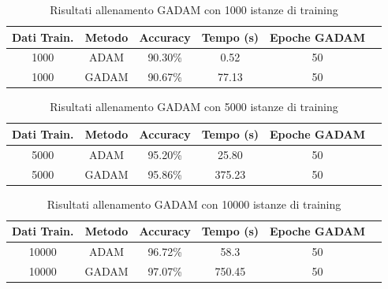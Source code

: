 \begin{table}[H]
\centering
\begin{tabular}{|c|c|c|c|c|c|}
\hline
\textbf{Dati Train.} & \textbf{Metodo} & \textbf{Accuracy}& \textbf{Tempo (s)} & \textbf{Epoche GADAM}\\
\hline
1000 & ADAM & 90.30\%  & 0.52 & 50 \\
\hline
1000 & GADAM &  90.67\%  & 77.13 & 50\\
\hline
\end{tabular}
\label{tab:GADAM_results_1000}
\caption{Risultati allenamento GADAM con 1000 istanze di training}
\end{table}


\begin{table}[htbp]
\centering
\begin{tabular}{|c|c|c|c|c|c|}
\hline
\textbf{Dati Train.} & \textbf{Metodo} & \textbf{Accuracy}& \textbf{Tempo (s)} & \textbf{Epoche GADAM}\\
\hline
5000 & ADAM & 95.20\%  & 25.80 & 50 \\
\hline
5000 & GADAM & 95.86\%  & 375.23  & 50\\
\hline
\end{tabular}
\label{tab:GADAM_results_5000}
\caption{Risultati allenamento GADAM con 5000 istanze di training}
\end{table}


\begin{table}[htbp]
\centering
\begin{tabular}{|c|c|c|c|c|c|}
\hline
\textbf{Dati Train.} & \textbf{Metodo} & \textbf{Accuracy}& \textbf{Tempo (s)} & \textbf{Epoche GADAM}\\
\hline
10000 & ADAM & 96.72\%  & 58.3 & 50 \\
\hline
10000 & GADAM &  97.07\%  & 750.45 & 50\\
\hline
\end{tabular}
\label{tab:GADAM_results_10000}
\caption{Risultati allenamento GADAM con 10000 istanze di training}
\end{table}

